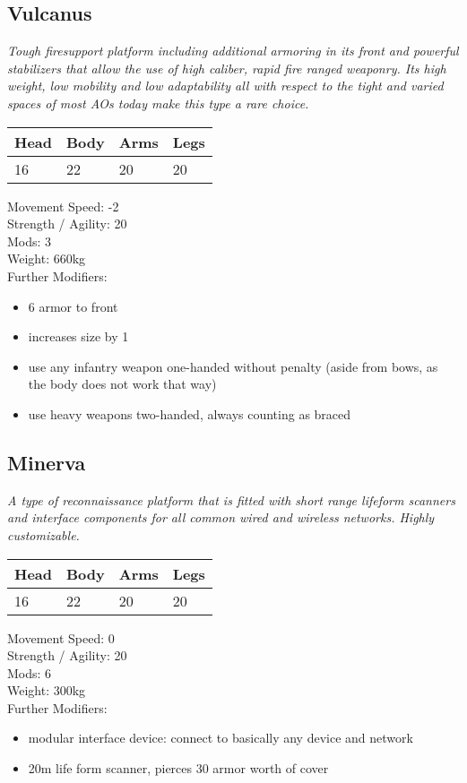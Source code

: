 \documentclass[12pt,a4paper,openany]{book}
\begin{document}
\begin{multicols}{2}
	\subsection{Vulcanus}
	\textit{Tough firesupport platform including additional armoring in its front and powerful stabilizers that allow the use of high caliber, rapid fire ranged weaponry. Its high weight, low mobility and low adaptability all with respect to the tight and varied spaces of most AOs today make this type a rare choice.}\par
	\begin{tabular}{|l|l|l|l|}
		\hline
		Head & Body & Arms & Legs\\
		\hline
		16 & 22 & 20 & 20\\
		\hline
	\end{tabular}
	\par
	Movement Speed: -2\\
	Strength / Agility: 20\\
	Mods: 3\\
	Weight: 660kg\\
	Further Modifiers:
	\vspace{-8mm}
	\begin{itemize}
		\setlength\itemsep{-8mm}
		\item 6 armor to front
		\item increases size by 1
		\item use any infantry weapon one-handed without penalty (aside from bows, as the body does not work that way)
		\item use heavy weapons two-handed, always counting as braced
	\end{itemize}
	\par
	\subsection{Minerva}
	\textit{A type of reconnaissance platform that is fitted with short range lifeform scanners and interface components for all common wired and wireless networks. Highly customizable.}\par
	\begin{tabular}{|l|l|l|l|}
		\hline
		Head & Body & Arms & Legs\\
		\hline
		16 & 22 & 20 & 20\\
		\hline
	\end{tabular}
	\par
	Movement Speed: 0\\
	Strength / Agility: 20\\
	Mods: 6\\
	Weight: 300kg\\
	Further Modifiers:
	\vspace{-8mm}
	\begin{itemize}
		\setlength\itemsep{-8mm}
		\item modular interface device: connect to basically any device and network
		\item 20m life form scanner, pierces 30 armor worth of cover
	\end{itemize}
	\par

\end{multicols}
\end{document}
